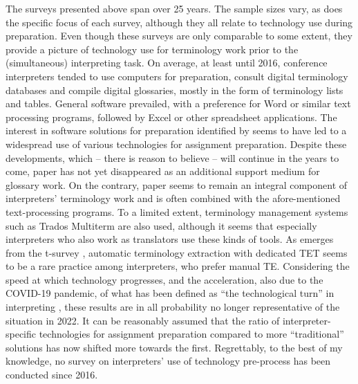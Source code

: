 The surveys presented above span over 25 years. The sample sizes vary, as does the specific focus of each survey, although they all relate to technology use during preparation. Even though these surveys are only comparable to some extent, they provide a picture of technology use for terminology work prior to the (simultaneous) interpreting task. On average, at least until 2016, conference interpreters tended to use computers for preparation, consult digital terminology databases and compile digital glossaries, mostly in the form of terminology lists and tables. General software prevailed, with a preference for Word or similar text processing programs, followed by Excel or other spreadsheet applications. The interest in software solutions for preparation identified by \citet{moser-mercer_banking_1992} seems to have led to a widespread use of various technologies for assignment preparation. Despite these developments, which – there is reason to believe – will continue in the years to come, paper has not yet disappeared as an additional support medium for glossary work. On the contrary, paper seems to remain an integral component of interpreters' terminology work and is often combined with the afore-mentioned text-processing programs. To a limited extent, terminology management systems such as Trados Multiterm are also used, although it seems that especially interpreters who also work as translators use these kinds of tools. As emerges from the t-survey \citep{zielinski_forschung_2005}, automatic terminology extraction with dedicated TET seems to be a rare practice among interpreters, who prefer manual TE. Considering the speed at which technology progresses, and the acceleration, also due to the COVID-19 pandemic, of what has been defined as ``the technological turn'' in interpreting \citep{fantinuoli_technological_2019}, these results are in all probability no longer representative of the situation in 2022. It can be reasonably assumed that the ratio of interpreter-specific technologies for assignment preparation compared to more ``traditional'' solutions has now shifted more towards the first. Regrettably, to the best of my knowledge, no survey on interpreters' use of technology pre-process has been conducted since 2016.


